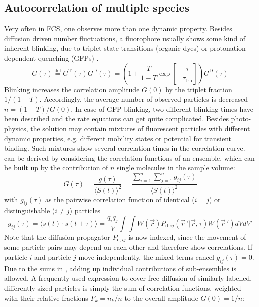 \subsection{Autocorrelation of multiple species}
\label{sec:theor.autoc}
Very often in FCS, one observes more than one dynamic property. Besides diffusion driven number fluctuations, a fluorophore usually shows some kind of inherent blinking, due to triplet state transitions (organic dyes) or protonation dependent quenching (GFPs) \cite{Widengren1995}.
	\begin{equation}
	\label{eq11}
	G(\tau) \stackrel{\mathrm{def}}{=} G^{\mathrm{T}}(\tau) G^{\mathrm{D}}(\tau) = \left( 1+ \frac{T}{1-T} \exp\left[-\frac{\tau}{\tau_{\mathrm{trp}}} \right] \right)G^{\mathrm{D}}(\tau)
	\end{equation}
Blinking increases the correlation amplitude $G(0)$ by the triplet fraction $1/(1-T)$. Accordingly, the average number of observed particles is decreased $n = (1-T)/G(0)$. In case of GFP blinking, two different blinking times have been described and the rate equations can get quite complicated.
Besides photo-physics, the solution may contain mixtures of fluorescent particles with different dynamic properties, e.g. different mobility states or potential for transient binding. Such mixtures show several correlation times in the correlation curve.  can be derived by considering the correlation functions of an ensemble, which can be built up by the contribution of $n$ single molecules in the sample volume:
	\begin{equation}
	\label{eq12}
	G(\tau) = \frac{g(\tau)}{\langle S(t) \rangle^2} = \frac{\sum_{i=1}^n \sum_{j=1}^n g_{ij}(\tau)}{\langle S(t) \rangle^2}
	\end{equation}
with $g_{ij}(\tau)$ as the pairwise correlation function of identical ($i = j$) or distinguishable ($i \not= j$) particles 
	\begin{equation}
	\label{eq13}
	g_{ij}(\tau) = \langle s(t) \cdot s(t + \tau) \rangle = \frac{q_iq_j}{V} \int \int W(\vec{r}) P_{\mathrm{d},ij} \left( \vec{r} \,' | \vec{r},\tau \right) W(\vec{r}\,') dVdV'
	\end{equation}
Note that the diffusion propagator $P_{\mathrm{d},ij}$ is now indexed, since the movement of some particle pairs may depend on each other and therefore show correlations. If particle $i$ and particle $j$ move independently, the mixed terms cancel $g_{ij}(\tau) = 0$.
Due to the sums in , adding up individual contributions of sub-ensembles is allowed. A frequently used expression to cover free diffusion of similarly labelled, differently sized particles is simply the sum of correlation functions, weighted with their relative fractions $F_k = n_k/n$ to the overall amplitude $G(0) = 1/n$:

